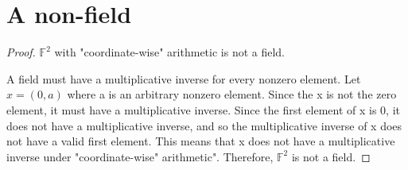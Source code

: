 \section{A non-field}
\begin{proof} $\mathbb{F}^2$ with "coordinate-wise" arithmetic is not a field.

    A field must have a multiplicative inverse for every nonzero element.
    Let $x = (0, a)$ where a is an arbitrary nonzero element. 
    Since the x is not the zero element, it must have a multiplicative inverse.
    Since the first element of x is 0, it does not have a multiplicative inverse,
    and so the multiplicative inverse of x does not have a valid first element.
    This means that x does not have a multiplicative inverse 
    under "coordinate-wise" arithmetic".
    Therefore, $\mathbb{F}^2$ is not a field.
\end{proof}